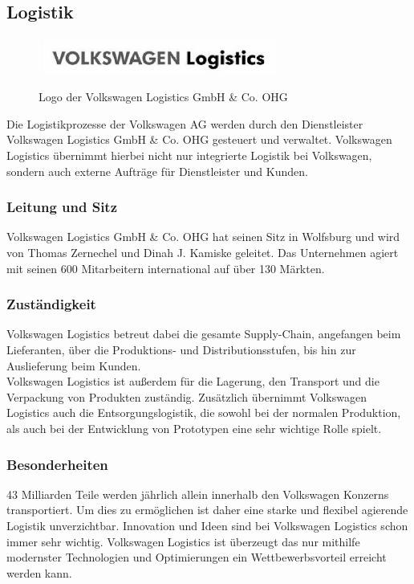 \documentclass[12pt]{article}
\begin{document}
\subsection{Logistik}
\begin{figure}[!h]
	\centering
	\includegraphics[width=0.7\textwidth]{images/logologistics.jpg}
	\caption{Logo der Volkswagen Logistics GmbH \& Co. OHG}
	\label{fig:vwlogisticspic}
	\cite{vwlogisticspic}
\end{figure}\FloatBarrier
Die Logistikprozesse der Volkswagen AG werden durch den Dienstleister Volkswagen Logistics GmbH \& Co. OHG gesteuert und verwaltet.
Volkswagen Logistics übernimmt hierbei nicht nur integrierte Logistik bei Volkswagen, sondern auch externe Aufträge für Dienstleister und Kunden.\cite{vwlogistics}

\subsubsection{Leitung und Sitz}
Volkswagen Logistics GmbH \& Co. OHG hat seinen Sitz in Wolfsburg und wird von Thomas Zernechel und Dinah J. Kamiske geleitet.
Das Unternehmen agiert mit seinen 600 Mitarbeitern international auf über 130 Märkten.\cite{vwlogistics}

\subsubsection{Zuständigkeit}
Volkswagen Logistics betreut dabei die gesamte Supply-Chain, angefangen beim Lieferanten, über die Produktions- und Distributionsstufen, bis hin zur Auslieferung beim Kunden.\\
Volkswagen Logistics ist außerdem für die Lagerung, den Transport und die Verpackung von Produkten zuständig. Zusätzlich übernimmt Volkswagen Logistics auch die Entsorgungslogistik, die sowohl bei der normalen Produktion, als auch bei der Entwicklung von Prototypen eine sehr wichtige Rolle spielt.\cite{vwlogistics}

\subsubsection{Besonderheiten}
43 Milliarden Teile werden jährlich allein innerhalb den Volkswagen Konzerns transportiert. Um dies zu ermöglichen ist daher eine starke und flexibel agierende Logistik unverzichtbar.
Innovation und Ideen sind bei Volkswagen Logistics schon immer sehr wichtig. Volkswagen Logistics ist überzeugt das nur mithilfe modernster Technologien und Optimierungen ein Wettbewerbsvorteil erreicht werden kann.
\end{document}
